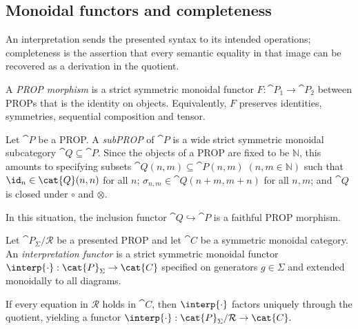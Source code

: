 
\subsection{Monoidal functors and completeness}

An interpretation sends the presented syntax to its intended operations; completeness is the
assertion that every semantic equality in that image can be recovered as a derivation in the
quotient.

\begin{definition}\label{def:prop-morphism}
A \emph{PROP morphism} is a strict symmetric monoidal functor
\(F:\cat{P}_1\to\cat{P}_2\) between PROPs that is the identity on objects.
Equivalently, \(F\) preserves identities, symmetries, sequential composition and
tensor.
\end{definition}

\begin{definition}\label{def:subprop}
Let \(\cat{P}\) be a PROP.
A \emph{subPROP} of \(\cat{P}\) is a wide strict symmetric monoidal subcategory
\(\cat{Q}\subseteq\cat{P}\).
Since the objects of a PROP are fixed to be \(\mathbb{N}\), this amounts to specifying
subsets
\(
  \cat{Q}(n,m)\subseteq \cat{P}(n,m)\;(n,m\in\mathbb{N})
\)
such that \(\id_n\in \cat{Q}(n,n)\) for all \(n\); \(\sigma_{n,m}\in \cat{Q}(n+m,m+n)\) for all \(n,m\); and
\(\cat{Q}\) is closed under \(\circ\) and \(\otimes\).

In this situation, the inclusion functor \(\cat{Q}\hookrightarrow \cat{P}\) is a faithful PROP morphism.
\end{definition}

\begin{definition}\label{def:interpretation-functor}
Let \(\cat{P}_\Sigma/\mathcal{R}\) be a presented PROP and let \(\cat{C}\) be a
symmetric monoidal category. An \emph{interpretation functor} is a strict
symmetric monoidal functor
\(
  \interp{\cdot}:\cat{P}_\Sigma\to\cat{C}
\)
specified on generators \(g\in\Sigma\) and extended monoidally to all diagrams.

If every equation in \(\mathcal{R}\) holds in \(\cat{C}\), then
\(\interp{\cdot}\) factors uniquely through the quotient, yielding a functor
\(
  \interp{\cdot}:\cat{P}_\Sigma/\mathcal{R}\to\cat{C}.
\)
\end{definition}

